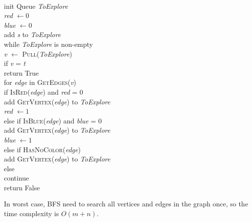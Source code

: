 \documentclass[11pt]{article}
\begin{document}
\begin{solution}
	\begin{center}
	\begin{algorithm}
		\+
		\\ init Queue \textit{ToExplore}
		\\ \textit{red} $\gets 0$
		\\ \textit{blue} $\gets 0$
		\\ add \textit{s} to \textit{ToExplore}
		\\ while \textit{ToExplore} is non-empty\+
		\\	\textit{v} $\gets$ \textsc{Pull}(\textit{ToExplore})
		\\	if \textit{v} = \textit{t}\+
		\\		return True\-
		\\  for \textit{edge} in \textsc{GetEdges}(\textit{v})\+
		\\		if \textsc{IsRed}(\textit{edge}) and \textit{red} = $0$\+
		\\			add \textsc{GetVertex}(\textit{edge}) to \textit{ToExplore}
		\\			\textit{red} $\gets 1$\-
		\\		else if \textsc{IsBlue}(\textit{edge}) and \textit{blue} = $0$\+
		\\			add \textsc{GetVertex}(\textit{edge}) to \textit{ToExplore}
		\\			\textit{blue} $\gets 1$\-
		\\		else if \textsc{HasNoColor}(\textit{edge})\+
		\\			add \textsc{GetVertex}(\textit{edge}) to \textit{ToExplore}\-
		\\		else\+
		\\			continue\-\-\-
		\\ return False
					
	\end{algorithm}	
	\end{center}
			
	In worst case, BFS need to search all vertices and edges in the graph once, so the time complexity is $O(m + n)$.
\end{solution}
\clearpage
\end{document}
